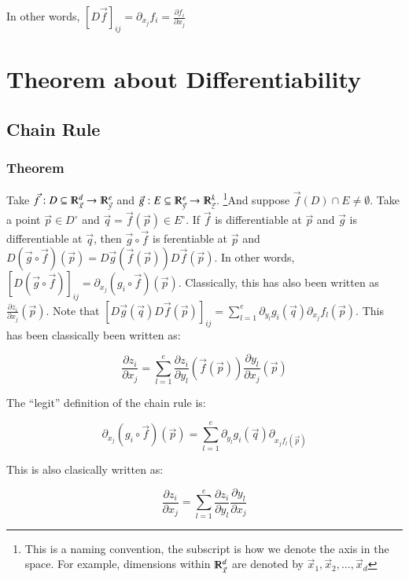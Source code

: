 \documentclass [12 pt, twoside] {book}
\newcommand\+{\text{ }}
\begin{document}
In other words, $[D\vec{f}]_{ij} = \partial_{x_j} f_i = \frac{\partial
f_i}{\partial x_j}$

\section{Theorem about Differentiability}
\subsection{Chain Rule}
\subsubsection{Theorem}
Take $\vec{f} : D \subseteq \varmathbb{R}^d_{\vec{x}} \to
\varmathbb{R}^e_{\vec{y}}$ and $\vec{g}: E
\subseteq \varmathbb{R}^e_{\vec{y}} \to \varmathbb{R}^k_{\vec{z}}$. \footnote{This is a naming convention, the subscript
is how we denote the axis in the space. For example, dimensions within
$\varmathbb{R}^d_{\vec{x}}$ are denoted by $\vec{x}_1, \vec{x}_2, \dots,
\vec{x}_d$}And suppose $\vec{f}(D) \cap E
\neq \emptyset$. Take a point $\vec{p} \in D^\circ$ and $\vec{q} = \vec{f}(\vec{p}) \in
E^\circ$. If $\vec{f}$ is differentiable at $\vec{p}$ and $\vec{g}$ is
differentiable at $\vec{q}$, then $\vec{g} \circ \vec{f}$ is
ferentiable at $\vec{p}$ and $D(\vec{g} \circ \vec{f}) (\vec{p}) =
D\vec{g}(\vec{f}(\vec{p})) D\vec{f}(\vec{p})$. In other words, $[D(\vec{g} \circ
\vec{f})]_{ij} = \partial_{x_j}(g_i \circ \vec{f})(\vec{p})$. Classically, this
has also been written as $\frac{\partial z_i}{\partial x_j} (\vec{p})$. Note
that $[D\vec{g}(\vec{q}) D\vec{f}(\vec{p})]_{ij} = \sum_{l = 1}^e \partial_{y_l} g_i
(\vec{q}) \partial_{x_j} f_l (\vec{p})$. This has been classically been written
as:

\[
    \frac{\partial z_i}{\partial x_j} = \sum_{l = 1}^e \frac{\partial z_i}{\partial y_l} (\vec{f}(\vec{p}))
    \frac{\partial y_l}{\partial x_j} (\vec{p})
\]

The ``legit'' definition of the chain rule is:

\[
    \partial_{x_j} (g_i \circ \vec{f})(\vec{p}) = \sum_{l = 1}^e \partial_{y_l}
    g_i(\vec{q}) \partial_{x_j f_l (\vec{p})}
\]

This is also clasically written as:

\[
    \frac{\partial z_i}{\partial x_j} = \sum_{l=1}^e \frac{\partial
    z_i}{\partial y_l} \frac{\partial y_l}{\partial x_j}
\]
\end{document}
